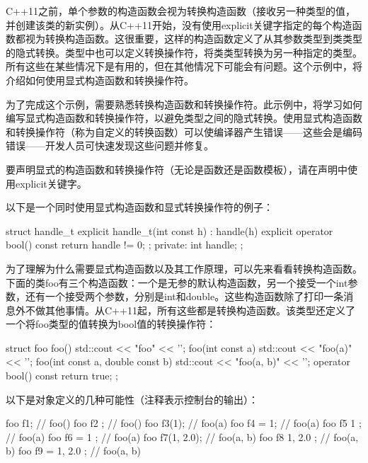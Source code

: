 
C++11之前，单个参数的构造函数会视为转换构造函数（接收另一种类型的值，并创建该类的新实例）。从C++11开始，没有使用explicit关键字指定的每个构造函数都视为转换构造函数。这很重要，这样的构造函数定义了从其参数类型到类类型的隐式转换。类型中也可以定义转换操作符，将类类型转换为另一种指定的类型。所有这些在某些情况下是有用的，但在其他情况下可能会有问题。这个示例中，将介绍如何使用显式构造函数和转换操作符。


为了完成这个示例，需要熟悉转换构造函数和转换操作符。此示例中，将学习如何编写显式构造函数和转换操作符，以避免类型之间的隐式转换。使用显式构造函数和转换操作符（称为自定义的转换函数）可以使编译器产生错误——这些会是编码错误——开发人员可快速发现这些问题并修复。


要声明显式的构造函数和转换操作符（无论是函数还是函数模板），请在声明中使用explicit关键字。

以下是一个同时使用显式构造函数和显式转换操作符的例子：

\begin{cpp}
struct handle_t
{
    explicit handle_t(int const h) : handle(h) {}
    explicit operator bool() const { return handle != 0; };
private:
    int handle;
};
\end{cpp}


为了理解为什么需要显式构造函数以及其工作原理，可以先来看看转换构造函数。下面的类foo有三个构造函数：一个是无参的默认构造函数，另一个接受一个int参数，还有一个接受两个参数，分别是int和double。这些构造函数除了打印一条消息外不做其他事情。从C++11起，所有这些都是转换构造函数。该类型还定义了一个将foo类型的值转换为bool值的转换操作符：

\begin{cpp}
struct foo
{
    foo()
    { std::cout << "foo" << '\n'; }
    foo(int const a)
    { std::cout << "foo(a)" << '\n'; }
    foo(int const a, double const b)
    { std::cout << "foo(a, b)" << '\n'; }
    operator bool() const { return true; }
};
\end{cpp}

以下是对象定义的几种可能性（注释表示控制台的输出）：

\begin{cpp}
foo f1;              // foo()
foo f2 {};           // foo()
foo f3(1);           // foo(a)
foo f4 = 1;          // foo(a)
foo f5 { 1 };        // foo(a)
foo f6 = { 1 };      // foo(a)
foo f7(1, 2.0);      // foo(a, b)
foo f8 { 1, 2.0 };   // foo(a, b)
foo f9 = { 1, 2.0 }; // foo(a, b)
\end{cpp}

